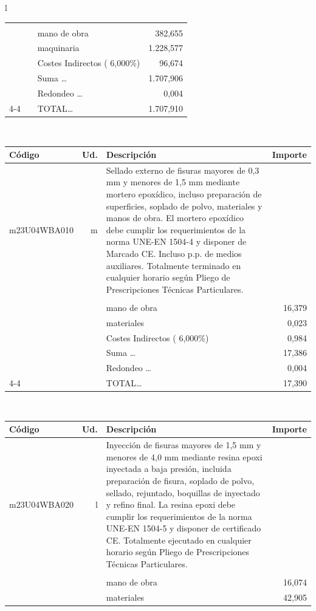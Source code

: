 \documentclass{book}%
\begin{document}
\begin{longtable}{l}
\begin{tabular}{l r p{60mm} r}
&&&\\%
&&mano de obra&   382,655\\%
&&maquinaria& 1.228,577\\%
&&Costes Indirectos (     6,000\%)&    96,674\\%
&&Suma \ldots& 1.707,906\\%
&&Redondeo \ldots&     0,004\\%
\cline{4-4}%
&&TOTAL\ldots& 1.707,910\\%
\end{tabular}\\%
\begin{tabular}{l r p{60mm} r}%
Código&Ud.&Descripción&Importe\\%
\hline%
m23U04WBA010&m&Sellado externo de fisuras mayores de 0,3 mm y menores de 1,5 mm mediante mortero epoxídico, incluso preparación de superficies, soplado de polvo, materiales y manos de obra. El mortero epoxídico debe cumplir los requerimientos de la norma UNE{-}EN 1504{-}4 y disponer de Marcado CE. Incluso p.p. de medios auxiliares. Totalmente terminado en cualquier horario según Pliego de Prescripciones Técnicas Particulares.&\\%
&&&\\%
&&mano de obra&    16,379\\%
&&materiales&     0,023\\%
&&Costes Indirectos (     6,000\%)&     0,984\\%
&&Suma \ldots&    17,386\\%
&&Redondeo \ldots&     0,004\\%
\cline{4-4}%
&&TOTAL\ldots&    17,390\\%
\end{tabular}\\%
\begin{tabular}{l r p{60mm} r}%
Código&Ud.&Descripción&Importe\\%
\hline%
m23U04WBA020&l&Inyección de fisuras mayores de 1,5 mm y menores de 4,0 mm mediante resina epoxi inyectada a baja presión, incluida preparación de fisura, soplado de polvo, sellado, rejuntado, boquillas de inyectado y refino final. La resina epoxi debe cumplir los requerimientos de la norma UNE{-}EN 1504{-}5 y disponer de certificado CE. Totalmente ejecutado en cualquier horario según Pliego de Prescripciones Técnicas Particulares.&\\%
&&&\\%
&&mano de obra&    16,074\\%
&&materiales&    42,905\\%

\end{tabular}
\end{longtable}
\end{document}
